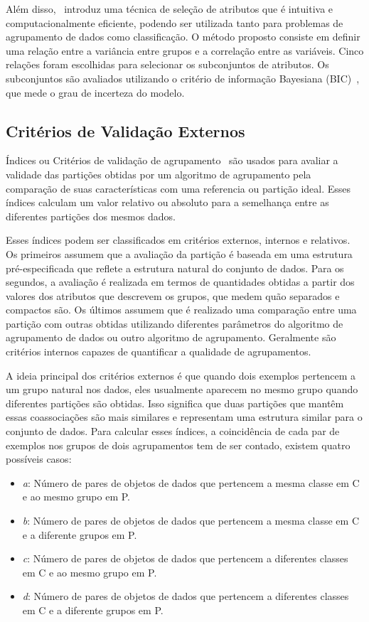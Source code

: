 \documentclass{acm_proc_article-sp}
\begin{document}
Além disso,~\cite{andrews2013variable} introduz uma técnica de seleção de atributos que é intuitiva e computacionalmente eficiente, podendo ser utilizada tanto para problemas de agrupamento de dados como classificação.
O método proposto consiste em definir uma relação entre a variância entre grupos e a correlação entre as variáveis.
Cinco relações foram escolhidas para selecionar os subconjuntos de atributos.
Os subconjuntos são avaliados utilizando o critério de informação Bayesiana (BIC)~\cite{schwarz1978estimating}, que mede o grau de incerteza do modelo. 

\subsection{Critérios de Validação Externos}
\label{sec:external_criterion}
Índices ou Critérios de validação de agrupamento~\cite{halkidi2001clustering, milligan1985examination} são usados para avaliar a validade das partições obtidas por um algoritmo de agrupamento pela comparação de suas características com uma referencia ou partição ideal.
Esses índices calculam um valor relativo ou absoluto para a semelhança entre as diferentes partições dos mesmos dados.

Esses índices podem ser classificados em critérios externos, internos e relativos.
Os primeiros assumem que a avaliação da partição é baseada em uma estrutura pré-especificada que reflete a estrutura natural do conjunto de dados.
Para os segundos, a avaliação é realizada em termos de quantidades obtidas a partir dos valores dos atributos que descrevem os grupos, que medem quão separados e compactos são.
Os últimos assumem que é realizado uma comparação entre uma partição com outras obtidas utilizando diferentes parâmetros do algoritmo de agrupamento de dados ou outro algoritmo de agrupamento.
Geralmente são critérios internos capazes de quantificar a qualidade de agrupamentos.

A ideia principal dos critérios externos é que quando dois exemplos pertencem a um grupo natural nos dados, eles usualmente aparecem no mesmo grupo quando diferentes partições são obtidas.
Isso significa que duas partições que mantêm essas coassociações são mais similares e representam uma estrutura similar para o conjunto de dados.
Para calcular esses índices, a coincidência de cada par de exemplos nos grupos de dois agrupamentos tem de ser contado, existem quatro possíveis casos:
\begin{itemize}
    \item \textit{a}: Número de pares de objetos de dados que pertencem a mesma classe em C e ao mesmo grupo em P.
    \item \textit{b}: Número de pares de objetos de dados que pertencem a mesma classe em C e a diferente grupos em P.
    \item \textit{c}: Número de pares de objetos de dados que pertencem a diferentes classes em C e ao mesmo grupo em P.  
    \item \textit{d}: Número de pares de objetos de dados que pertencem a diferentes classes em C e a diferente grupos em P.
\end{itemize}  
\end{document}
